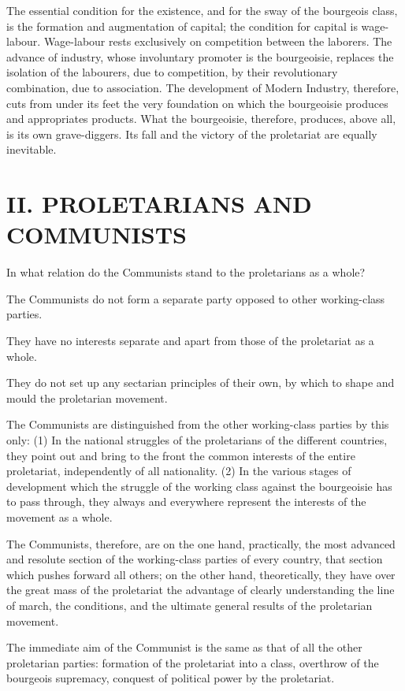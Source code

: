 \documentclass[11pt]{book}
\begin{document}
The essential condition for the existence, and for the sway of
the bourgeois class, is the formation and augmentation of
capital; the condition for capital is wage-labour.  Wage-labour
rests exclusively on competition between the laborers.  The
advance of industry, whose involuntary promoter is the bourgeoisie,
replaces the isolation of the labourers, due to competition,
by their revolutionary combination, due to association.  The
development of Modern Industry, therefore, cuts from under its
feet the very foundation on which the bourgeoisie produces and
appropriates products.  What the bourgeoisie, therefore, produces,
above all, is its own grave-diggers.  Its fall and the victory of
the proletariat are equally inevitable.


\chapter*{II.  PROLETARIANS AND COMMUNISTS}

In what relation do the Communists stand to the proletarians as a
whole?

The Communists do not form a separate party opposed to other
working-class parties.

They have no interests separate and apart from those of the
proletariat as a whole.

They do not set up any sectarian principles of their own,
by which to shape and mould the proletarian movement.

The Communists are distinguished from the other working-class parties
by this only: (1) In the national struggles of the proletarians
of the different countries, they point out and bring to the front
the common interests of the entire proletariat, independently of
all nationality.  (2) In the various stages of development which the
struggle of the working class against the bourgeoisie has to pass
through, they always and everywhere represent the interests of the
movement as a whole.

The Communists, therefore, are on the one hand, practically,
the most advanced and resolute section of the working-class
parties of every country, that section which pushes forward
all others; on the other hand, theoretically, they have over
the great mass of the proletariat the advantage of clearly
understanding the line of march, the conditions, and the ultimate
general results of the proletarian movement.

The immediate aim of the Communist is the same as that of all
the other proletarian parties: formation of the proletariat into
a class, overthrow of the bourgeois supremacy, conquest of
political power by the proletariat.
\end{document}
